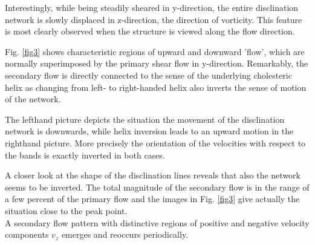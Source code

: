 \documentclass[aps,pre,onecolumn,groupedaddress]{revtex4-1}
\begin{document}
Interestingly, while being steadily sheared in y-direction, the entire disclination network is slowly displaced in z-direction, the direction of vorticity.
This feature is most clearly observed when the structure is viewed along the flow direction.

Fig. \ref{fig3} shows characteristic regions of upward and downward 'flow', which are normally superimposed by the primary shear flow in y-direction.
Remarkably, the secondary flow is directly connected to the sense of the underlying cholesteric helix as changing from left- to right-handed helix also inverts the sense of motion of the network.

The lefthand picture depicts the situation the movement of the disclination network is downwards, while helix inversion leads to an upward motion in the righthand picture.
More precisely the orientation of the velocities with respect to the bands is exactly inverted in both cases. 

A closer look at the shape of the disclination lines reveals that also the network seems to be inverted. 
The total magnitude of the secondary flow is in the range of a few percent of the primary flow and the images in Fig. \ref{fig3} give actually the situation close to the peak point.\\ 

A secondary flow pattern with distinctive regions of positive and negative velocity components $v_z$ emerges and reoccurs periodically.
\end{document}
